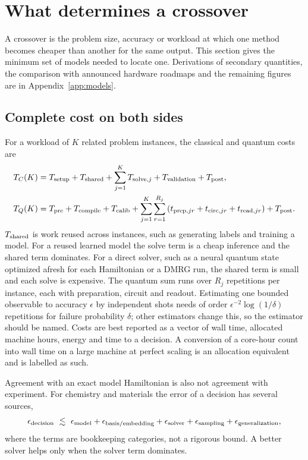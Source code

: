 \section{What determines a crossover}
\label{sec:cross}

A crossover is the problem size, accuracy or workload at which one method becomes cheaper than another for the same output. This section gives the minimum set of models needed to locate one. Derivations of secondary quantities, the comparison with announced hardware roadmaps and the remaining figures are in Appendix~\ref{app:models}.

\subsection{Complete cost on both sides}
\label{sec:cost}
For a workload of $K$ related problem instances, the classical and quantum costs are
\begin{align}
T_C(K) &= T_{\rm setup}+T_{\rm shared}+\sum_{j=1}^{K}T_{{\rm solve},j}+T_{\rm validation}+T_{\rm post},\label{eq:tck}\\
T_Q(K) &= T_{\rm pre}+T_{\rm compile}+T_{\rm calib}+\sum_{j=1}^{K}\sum_{r=1}^{R_j}\left(t_{{\rm prep},jr}+t_{{\rm circ},jr}+t_{{\rm read},jr}\right)+T_{\rm post}.\label{eq:tqk}
\end{align}
$T_{\rm shared}$ is work reused across instances, such as generating labels and training a model. For a reused learned model the solve term is a cheap inference and the shared term dominates. For a direct solver, such as a neural quantum state optimized afresh for each Hamiltonian or a DMRG run, the shared term is small and each solve is expensive. The quantum sum runs over $R_j$ repetitions per instance, each with preparation, circuit and readout. Estimating one bounded observable to accuracy $\epsilon$ by independent shots needs of order $\epsilon^{-2}\log(1/\delta)$ repetitions for failure probability $\delta$; other estimators change this, so the estimator should be named. Costs are best reported as a vector of wall time, allocated machine hours, energy and time to a decision. A conversion of a core-hour count into wall time on a large machine at perfect scaling is an allocation equivalent and is labelled as such.

Agreement with an exact model Hamiltonian is also not agreement with experiment. For chemistry and materials the error of a decision has several sources,
\begin{equation}
\epsilon_{\rm decision}\ \lesssim\ \epsilon_{\rm model}+\epsilon_{\rm basis/embedding}+\epsilon_{\rm solver}+\epsilon_{\rm sampling}+\epsilon_{\rm generalization},
\label{eq:errbudget}
\end{equation}
where the terms are bookkeeping categories, not a rigorous bound. A better solver helps only when the solver term dominates.


